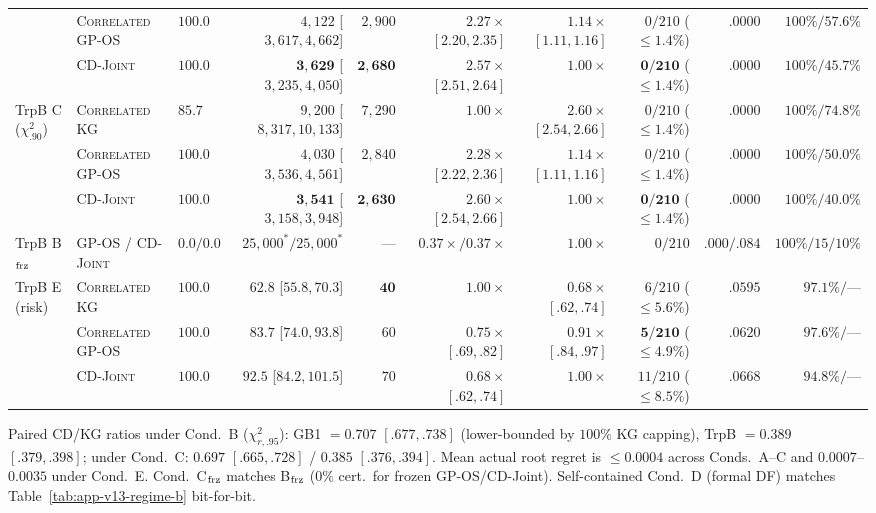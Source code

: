 \documentclass{article}
\theoremstyle{plain}
\theoremstyle{definition}
\begin{document}
\begin{table}[!htbp]
{\begin{tabular}{@{}lllrrrrrrr@{}}
 & \textsc{Correlated GP-OS} & $\mathbf{100.0}$ & $4{,}122$ [$3{,}617,4{,}662$] & $2{,}900$ & $2.27\times$ $[2.20,2.35]$ & $1.14\times$ $[1.11,1.16]$ & $0/210$ ($\le 1.4\%$) & $.0000$ & $100\% / 57.6\%$ \\
 & \textsc{CD-Joint} & $\mathbf{100.0}$ & $\mathbf{3{,}629}$ [$3{,}235,4{,}050$] & $\mathbf{2{,}680}$ & $\mathbf{2.57\times}$ $[2.51,2.64]$ & $1.00\times$ & $\mathbf{0/210}$ ($\le 1.4\%$) & $.0000$ & $100\% / 45.7\%$ \\
\midrule
\multirow{3}{*}{TrpB C ($\chi^2_{.90}$)}
 & \textsc{Correlated KG} & $85.7$ & $9{,}200$ [$8{,}317,10{,}133$] & $7{,}290$ & $1.00\times$ & $2.60\times$ $[2.54,2.66]$ & $0/210$ ($\le 1.4\%$) & $.0000$ & $100\% / 74.8\%$ \\
 & \textsc{Correlated GP-OS} & $\mathbf{100.0}$ & $4{,}030$ [$3{,}536,4{,}561$] & $2{,}840$ & $2.28\times$ $[2.22,2.36]$ & $1.14\times$ $[1.11,1.16]$ & $0/210$ ($\le 1.4\%$) & $.0000$ & $100\% / 50.0\%$ \\
 & \textsc{CD-Joint} & $\mathbf{100.0}$ & $\mathbf{3{,}541}$ [$3{,}158,3{,}948$] & $\mathbf{2{,}630}$ & $\mathbf{2.60\times}$ $[2.54,2.66]$ & $1.00\times$ & $\mathbf{0/210}$ ($\le 1.4\%$) & $.0000$ & $100\% / 40.0\%$ \\
\midrule
TrpB B$_{\rm frz}$ & \textsc{GP-OS} / \textsc{CD-Joint} & $0.0 / 0.0$ & $25{,}000^* / 25{,}000^*$ & --- & $0.37\times / 0.37\times$ & $1.00\times$ & $0/210$ & $.000/.084$ & $100\% / 15/10\%$ \\
\midrule
\multirow{3}{*}{TrpB E (risk)}
 & \textsc{Correlated KG} & $\mathbf{100.0}$ & $\mathbf{62.8}$ [$55.8,70.3$] & $\mathbf{40}$ & $1.00\times$ & $0.68\times$ $[.62,.74]$ & $6/210$ ($\le 5.6\%$) & $.0595$ & $97.1\% / \text{---}$ \\
 & \textsc{Correlated GP-OS} & $\mathbf{100.0}$ & $83.7$ [$74.0,93.8$] & $60$ & $0.75\times$ $[.69,.82]$ & $0.91\times$ $[.84,.97]$ & $\mathbf{5/210}$ ($\le 4.9\%$) & $.0620$ & $97.6\% / \text{---}$ \\
 & \textsc{CD-Joint} & $\mathbf{100.0}$ & $92.5$ [$84.2,101.5$] & $70$ & $0.68\times$ $[.62,.74]$ & $1.00\times$ & $11/210$ ($\le 8.5\%$) & $.0668$ & $94.8\% / \text{---}$ \\
\bottomrule
\end{tabular}%
}
\par\vspace{2pt}\noindent
\parbox{\linewidth}{\scriptsize Paired \textsc{CD/KG} ratios under Cond.\ B ($\chi^2_{r,.95}$): GB1 $=0.707$ $[.677,.738]$ (lower-bounded by $100\%$ KG capping), TrpB $=0.389$ $[.379,.398]$; under Cond.\ C: $0.697$ $[.665,.728]$ / $0.385$ $[.376,.394]$. Mean actual root regret is $\le 0.0004$ across Conds.\ A--C and $0.0007$--$0.0035$ under Cond.\ E. Cond.\ C$_{\rm frz}$ matches B$_{\rm frz}$ ($0\%$ cert.\ for frozen GP-OS/CD-Joint). Self-contained Cond.\ D (formal DF) matches Table~\ref{tab:app-v13-regime-b} bit-for-bit.}
\end{table}
\end{document}
